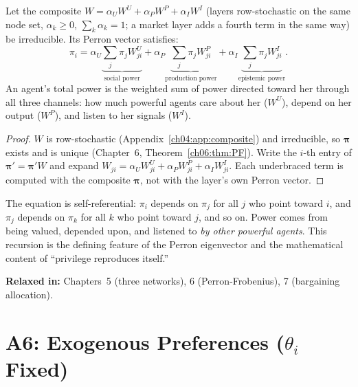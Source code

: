 \documentclass[../structural_economics_book.tex]{subfiles}
\begin{document}
\begin{proposition}\label{ch04:prop:A5_decomp}
Let the composite $W = \alpha_U W^U + \alpha_P W^P + \alpha_I W^I$ (layers row-stochastic on the same node set, $\alpha_k \ge 0$, $\sum_k\alpha_k = 1$; a market layer adds a fourth term in the same way) be irreducible. Its Perron vector satisfies:
\begin{equation}\label{ch04:eq:power_decomp}
\pi_i = \alpha_U \underbrace{\sum_j \pi_j W^U_{ji}}_{\text{social power}} + \alpha_P \underbrace{\sum_j \pi_j W^P_{ji}}_{\text{production power}} + \alpha_I \underbrace{\sum_j \pi_j W^I_{ji}}_{\text{epistemic power}}.
\end{equation}
An agent's total power is the weighted sum of power directed toward her through all three channels: how much powerful agents care about her ($W^U$), depend on her output ($W^P$), and listen to her signals ($W^I$).
\end{proposition}

\begin{proof}
$W$ is row-stochastic (Appendix~\ref{ch04:app:composite}) and irreducible, so $\boldsymbol{\pi}$ exists and is unique (Chapter~6, Theorem~\ref{ch06:thm:PF}). Write the $i$-th entry of $\boldsymbol{\pi}' = \boldsymbol{\pi}'W$ and expand $W_{ji} = \alpha_U W^U_{ji} + \alpha_P W^P_{ji} + \alpha_I W^I_{ji}$. Each underbraced term is computed with the composite $\boldsymbol{\pi}$, not with the layer's own Perron vector.
\end{proof}

\begin{intuition}
The equation is self-referential: $\pi_i$ depends on $\pi_j$ for all $j$ who point toward $i$, and $\pi_j$ depends on $\pi_k$ for all $k$ who point toward $j$, and so on. Power comes from being valued, depended upon, and listened to \textit{by other powerful agents}. This recursion is the defining feature of the Perron eigenvector and the mathematical content of ``privilege reproduces itself.''
\end{intuition}

\textbf{Relaxed in:} Chapters~5 (three networks), 6 (Perron-Frobenius), 7 (bargaining allocation).


\section{A6: Exogenous Preferences ($\theta_i$ Fixed)}
\label{ch04:sec:A6}
\end{document}
